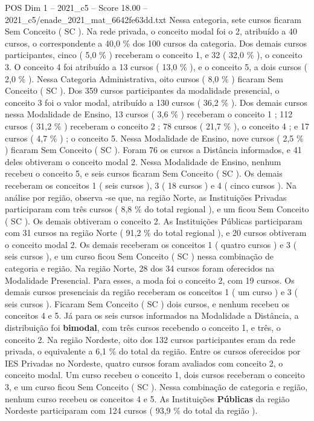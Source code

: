 \begin{textsample}{POS Dim 1 – 2021\_c5 – Score 18.00 – 2021\_c5/enade\_2021\_mat\_6642fe63dd.txt}
Nessa categoria, sete cursos ficaram Sem Conceito ( SC ).
Na rede privada, o conceito modal foi o 2, atribuído a 40 cursos, o correspondente a 40,0 \% dos 100 cursos da categoria.
Dos demais cursos participantes, cinco ( 5,0 \% ) receberam o conceito 1, e 32 ( 32,0 \% ), o conceito 3.
O conceito 4 foi atribuído a 13 cursos ( 13,0 \% ), e o conceito 5, a dois cursos ( 2,0 \% ).
Nessa Categoria Administrativa, oito cursos ( 8,0 \% ) ficaram Sem Conceito ( SC ).
Dos 359 cursos participantes da modalidade presencial, o conceito 3 foi o valor modal, atribuído a 130 cursos ( 36,2 \% ).
Dos demais cursos nessa Modalidade de Ensino, 13 cursos ( 3,6 \% ) receberam o conceito 1 ; 112 cursos ( 31,2 \% ) receberam o conceito 2 ; 78 cursos ( 21,7 \% ), o conceito 4 ; e 17 cursos ( 4,7 \% ) ; o conceito 5.
Nessa Modalidade de Ensino, nove cursos ( 2,5 \% ) ficaram Sem Conceito ( SC ).
Foram 76 os cursos a Distância informados, e 41 deles obtiveram o conceito modal 2.
Nessa Modalidade de Ensino, nenhum recebeu o conceito 5, e seis cursos ficaram Sem Conceito ( SC ).
Os demais receberam os conceitos 1 ( seis cursos ), 3 ( 18 cursos ) e 4 ( cinco cursos ).
Na análise por região, observa -se que, na região Norte, as Instituições Privadas participaram com três cursos ( 8,8 \% do total regional ), e um ficou Sem Conceito ( SC ).
Os demais obtiveram o conceito 2.
As Instituições Públicas participaram com 31 cursos na região Norte ( 91,2 \% do total regional ), e 20 cursos obtiveram o conceito modal 2.
Os demais receberam os conceitos 1 ( quatro cursos ) e 3 ( seis cursos ), e um curso ficou Sem Conceito ( SC ) nessa combinação de categoria e região.
Na região Norte, 28 dos 34 cursos foram oferecidos na Modalidade Presencial.
Para esses, a moda foi o conceito 2, com 19 cursos.
Os demais cursos presenciais da região receberam os conceitos 1 ( um curso ) e 3 ( seis cursos ).
Ficaram Sem Conceito ( SC ) dois cursos, e nenhum recebeu os conceitos 4 e 5.
Já para os seis cursos informados na Modalidade a Distância, a distribuição foi \textbf{bimodal}, com três cursos recebendo o conceito 1, e três, o conceito 2.
Na região Nordeste, oito dos 132 cursos participantes eram da rede privada, o equivalente a 6,1 \% do total da região.
Entre os cursos oferecidos por IES Privadas no Nordeste, quatro cursos foram avaliados com conceito 2, o conceito modal.
Um curso recebeu o conceito 1, dois cursos receberam o conceito 3, e um curso ficou Sem Conceito ( SC ).
Nessa combinação de categoria e região, nenhum curso recebeu os conceitos 4 e 5.
As Instituições \textbf{Públicas} da região Nordeste participaram com 124 cursos ( 93,9 \% do total da região ).

\end{textsample}

